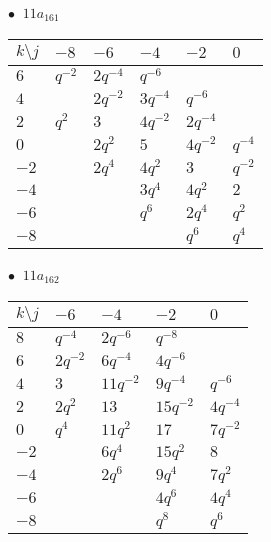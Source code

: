 \begin{minipage}{\linewidth}
$\bullet\ $ $11a_{161}$ \vspace{0.5em} \\
\begin{tabular}{l|lllll}
$k \setminus j$ & $-8$ & $-6$ & $-4$ & $-2$ & $0$ \\
\hline
$6$ & $q^{-2}$ & $2q^{-4}$ & $q^{-6}$ &  &  \\
$4$ &  & $2q^{-2}$ & $3q^{-4}$ & $q^{-6}$ &  \\
$2$ & $q^{2}$ & $3$ & $4q^{-2}$ & $2q^{-4}$ &  \\
$0$ &  & $2q^{2}$ & $5$ & $4q^{-2}$ & $q^{-4}$ \\
$-2$ &  & $2q^{4}$ & $4q^{2}$ & $3$ & $q^{-2}$ \\
$-4$ &  &  & $3q^{4}$ & $4q^{2}$ & $2$ \\
$-6$ &  &  & $q^{6}$ & $2q^{4}$ & $q^{2}$ \\
$-8$ &  &  &  & $q^{6}$ & $q^{4}$ \\
\end{tabular}
\vspace{2em}
\end{minipage}
%
\begin{minipage}{\linewidth}
$\bullet\ $ $11a_{162}$ \vspace{0.5em} \\
\begin{tabular}{l|llll}
$k \setminus j$ & $-6$ & $-4$ & $-2$ & $0$ \\
\hline
$8$ & $q^{-4}$ & $2q^{-6}$ & $q^{-8}$ &  \\
$6$ & $2q^{-2}$ & $6q^{-4}$ & $4q^{-6}$ &  \\
$4$ & $3$ & $11q^{-2}$ & $9q^{-4}$ & $q^{-6}$ \\
$2$ & $2q^{2}$ & $13$ & $15q^{-2}$ & $4q^{-4}$ \\
$0$ & $q^{4}$ & $11q^{2}$ & $17$ & $7q^{-2}$ \\
$-2$ &  & $6q^{4}$ & $15q^{2}$ & $8$ \\
$-4$ &  & $2q^{6}$ & $9q^{4}$ & $7q^{2}$ \\
$-6$ &  &  & $4q^{6}$ & $4q^{4}$ \\
$-8$ &  &  & $q^{8}$ & $q^{6}$ \\
\end{tabular}
\vspace{2em}
\end{minipage}
%
